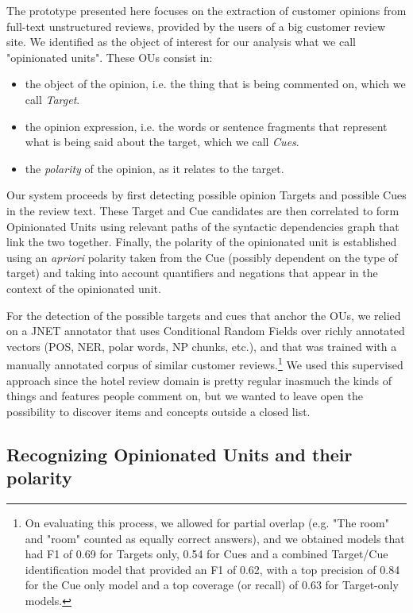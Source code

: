 \documentclass{llncs}
\begin{document}
The prototype presented here focuses on the extraction of customer opinions from full-text unstructured reviews, provided by the users of a big customer review site. We identified as the object of interest for our analysis what we call "opinionated units". These OUs consist in:
\begin{itemize}
\item the object of the opinion, i.e. the thing that is being commented on, which we call \emph{Target}.
\item the opinion expression, i.e. the words or sentence fragments that represent what is being said about the target, which we call \emph{Cues}.
\item the \emph{polarity} of the opinion, as it relates to the target.
\end{itemize}

Our system proceeds by first detecting possible opinion Targets and possible Cues in the review text. These Target and Cue candidates are then correlated to form Opinionated Units using relevant paths of the  syntactic dependencies graph that link the two together. Finally, the polarity of the opinionated unit is established using an \emph{apriori} polarity taken from the Cue (possibly dependent on the type of target) and taking into account quantifiers and negations that appear in the context of the opinionated unit.

For the detection of the possible targets and cues that anchor the OUs, we relied on a JNET annotator that uses Conditional Random Fields over richly annotated vectors (POS, NER, polar words, NP chunks, etc.), and that was trained with a manually annotated corpus of similar customer reviews.\footnote{On evaluating this process, we allowed for partial overlap (e.g. "The room" and "room" counted as equally correct answers), and we obtained models that had F1 of 0.69 for  Targets only, 0.54 for Cues and a combined Target/Cue identification model that provided an F1 of 0.62, with a top precision of 0.84 for the Cue only model and a top coverage (or recall) of 0.63 for Target-only models.} We used this supervised approach since the hotel review domain is pretty regular inasmuch the kinds of things and features people comment on, but we wanted to leave open the possibility to discover items and concepts outside a closed list.


\subsection{Recognizing Opinionated Units and their polarity}
\end{document}
